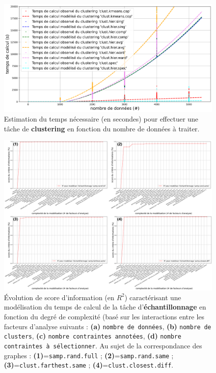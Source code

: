 			\begin{figure}[H]
				\centering
				\includegraphics[width=\textwidth]{figures/etude-temps-calcul-modelisation-3clust}
				\caption{Estimation du temps nécessaire (en secondes) pour effectuer une tâche de \textbf{clustering} en fonction du nombre de données à traiter.}
				\label{figure:4.3.1-ETUDE-COUTS-TEMPS-CALCUL-MODELISATION-CLUSTERING}
			\end{figure}
			
			
			\begin{figure}[H]
				\centering
				\includegraphics[width=\textwidth]{figures/etude-temps-calcul-analyse-facteurs-4samp}
				\caption{Évolution de score d'information (en \(R^2\)) caractérisant une modélisation du temps de calcul de la tâche d'\textbf{échantillonnage} en fonction du degré de complexité (basé sur les interactions entre les facteurs d'analyse suivants : \textbf{(a)} \texttt{nombre de données}, \textbf{(b)} \texttt{nombre de clusters}, \textbf{(c)} \texttt{nombre contraintes annotées}, \textbf{(d)} \texttt{nombre contraintes à sélectionner}. Au sujet de la correspondance des graphes : \textbf{(1)}=\texttt{samp.rand.full} ; \textbf{(2)}=\texttt{samp.rand.same} ; \textbf{(3)}=\texttt{clust.farthest.same} ; \textbf{(4)}=\texttt{clust.closest.diff}.}
				\label{figure:4.3.1-ETUDE-COUTS-TEMPS-CALCUL-ANALYSE-FACTEURS-SAMPLING}
			\end{figure}
		
